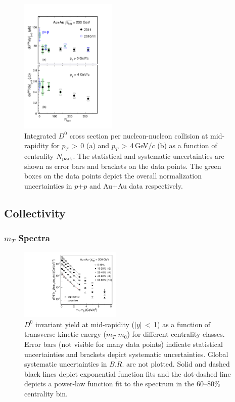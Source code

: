 \documentclass[%
 reprint,	
showpacs,
 amsmath,amssymb,
 aps,
 prc,
]{revtex4-1}
\begin{document}
\begin{figure}
\centering
\includegraphics[width=0.41\textwidth]{fig/Xsection_D0.pdf}
  \caption{Integrated $D^{0}$ cross section per nucleon-nucleon collision at mid-rapidity for $p_{T}$\,$>$\,0 (a) and $p_{T}$\,$>$\,4\,GeV/$c$ (b) as a function of centrality $N_{\rm part}$. The statistical and systematic uncertainties are shown as error bars and brackets on the data points. The green boxes on the data points depict the overall normalization uncertainties in $p$+$p$ and Au+Au data respectively.}
\label{fig:Xsection_D0} 
\end{figure}

\subsection{Collectivity}
\label{result:collectivity}

\subsubsection{$m_{T}$ Spectra}
\label{result:collectivity:mT}

\begin{figure}
\centering
\includegraphics[width=0.43\textwidth]{fig/mTFit_D0.pdf}
\caption{$D^{0}$ invariant yield at mid-rapidity ($|y|$\,$<$\,1) as a function of transverse kinetic energy ($m_{T}$-$m_{0}$) for different centrality classes. Error bars (not visible for many data points) indicate statistical uncertainties and brackets depict systematic uncertainties. Global systematic uncertainties in $B.R.$ are not plotted. Solid and dashed black lines depict exponential function fits and the dot-dashed line depicts a power-law function fit to the spectrum in the 60--80\% centrality bin.}
\label{fig:mTFit_D0} 
\end{figure}
\end{document}
